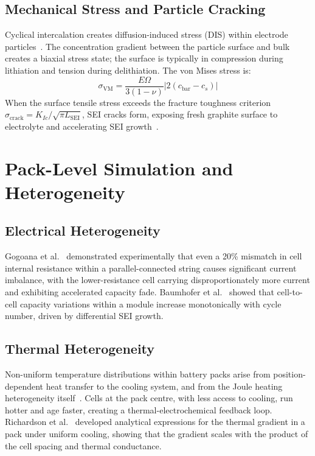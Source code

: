 \subsection{Mechanical Stress and Particle Cracking}
\label{ssec:lit_mechanics}

Cyclical intercalation creates diffusion-induced stress (DIS) within electrode particles~\cite{Christensen2006,Garcia2005}. The concentration gradient between the particle surface and bulk creates a biaxial stress state; the surface is typically in compression during lithiation and tension during delithiation. The von Mises stress is:
\begin{equation}
  \sigma_\text{VM} = \frac{E \Omega}{3(1-\nu)} \left|2(c_\text{bar} - c_s) \right|
  \label{eq:vm_stress_lit}
\end{equation}
When the surface tensile stress exceeds the fracture toughness criterion $\sigma_\text{crack} = K_{Ic}/\sqrt{\pi L_\text{SEI}}$, SEI cracks form, exposing fresh graphite surface to electrolyte and accelerating SEI growth~\cite{Reniers2019,Zhao2011}.

\section{Pack-Level Simulation and Heterogeneity}
\label{sec:lit_pack}

\subsection{Electrical Heterogeneity}
\label{ssec:lit_electrical_hetero}

Gogoana et al.~\cite{Gogoana2014} demonstrated experimentally that even a 20\% mismatch in cell internal resistance within a parallel-connected string causes significant current imbalance, with the lower-resistance cell carrying disproportionately more current and exhibiting accelerated capacity fade. Baumhofer et al.~\cite{Baumhofer2014} showed that cell-to-cell capacity variations within a module increase monotonically with cycle number, driven by differential SEI growth.

\subsection{Thermal Heterogeneity}
\label{ssec:lit_thermal_hetero}

Non-uniform temperature distributions within battery packs arise from position-dependent heat transfer to the cooling system, and from the Joule heating heterogeneity itself~\cite{Pesaran2001,Zhang2006}. Cells at the pack centre, with less access to cooling, run hotter and age faster, creating a thermal-electrochemical feedback loop. Richardson et al.~\cite{Richardson2014} developed analytical expressions for the thermal gradient in a pack under uniform cooling, showing that the gradient scales with the product of the cell spacing and thermal conductance.

